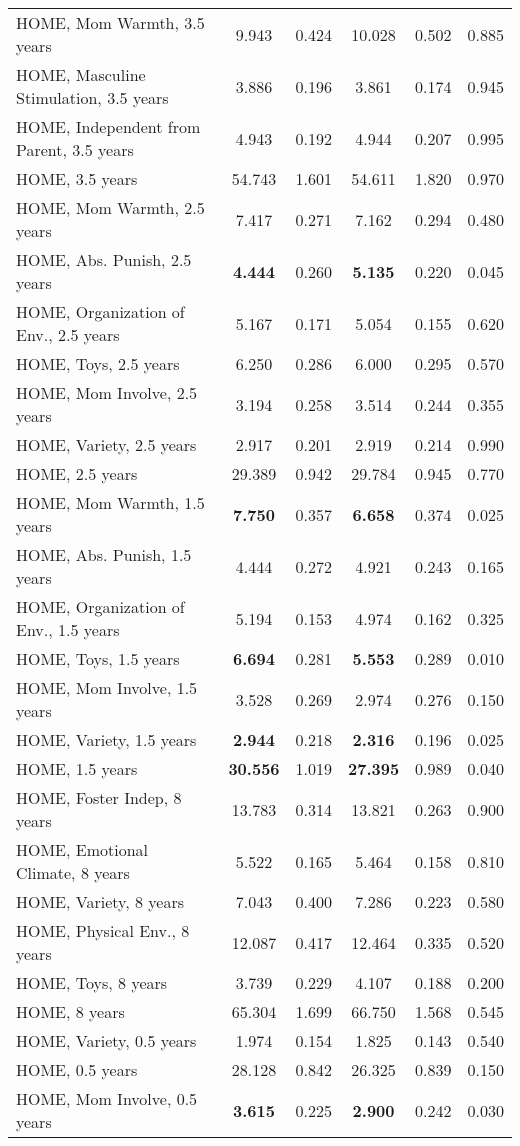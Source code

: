 \begin{tabular}{l c c c c c}
HOME, Mom Warmth, 3.5 years & 9.943 & 0.424 &  10.028 & 0.502 & 0.885 \\
HOME, Masculine Stimulation, 3.5 years & 3.886 & 0.196 &  3.861 & 0.174 & 0.945 \\
HOME, Independent from Parent, 3.5 years & 4.943 & 0.192 &  4.944 & 0.207 & 0.995 \\
HOME, 3.5 years & 54.743 & 1.601 &  54.611 & 1.820 & 0.970 \\
HOME, Mom Warmth, 2.5 years & 7.417 & 0.271 &  7.162 & 0.294 & 0.480 \\
HOME, Abs. Punish, 2.5 years & \textbf{4.444} & 0.260 &  \textbf{5.135} & 0.220 & 0.045 \\
HOME, Organization of Env., 2.5 years & 5.167 & 0.171 &  5.054 & 0.155 & 0.620 \\
HOME, Toys, 2.5 years & 6.250 & 0.286 &  6.000 & 0.295 & 0.570 \\
HOME, Mom Involve, 2.5 years & 3.194 & 0.258 &  3.514 & 0.244 & 0.355 \\
HOME, Variety, 2.5 years & 2.917 & 0.201 &  2.919 & 0.214 & 0.990 \\
HOME, 2.5 years & 29.389 & 0.942 &  29.784 & 0.945 & 0.770 \\
HOME, Mom Warmth, 1.5 years & \textbf{7.750} & 0.357 &  \textbf{6.658} & 0.374 & 0.025 \\
HOME, Abs. Punish, 1.5 years & 4.444 & 0.272 &  4.921 & 0.243 & 0.165 \\
HOME, Organization of Env., 1.5 years & 5.194 & 0.153 &  4.974 & 0.162 & 0.325 \\
HOME, Toys, 1.5 years & \textbf{6.694} & 0.281 &  \textbf{5.553} & 0.289 & 0.010 \\
HOME, Mom Involve, 1.5 years & 3.528 & 0.269 &  2.974 & 0.276 & 0.150 \\
HOME, Variety, 1.5 years & \textbf{2.944} & 0.218 &  \textbf{2.316} & 0.196 & 0.025 \\
HOME, 1.5 years & \textbf{30.556} & 1.019 &  \textbf{27.395} & 0.989 & 0.040 \\
HOME, Foster Indep, 8 years & 13.783 & 0.314 &  13.821 & 0.263 & 0.900 \\
HOME, Emotional Climate, 8 years & 5.522 & 0.165 &  5.464 & 0.158 & 0.810 \\
HOME, Variety, 8 years & 7.043 & 0.400 &  7.286 & 0.223 & 0.580 \\
HOME, Physical Env., 8 years & 12.087 & 0.417 &  12.464 & 0.335 & 0.520 \\
HOME, Toys, 8 years & 3.739 & 0.229 &  4.107 & 0.188 & 0.200 \\
HOME, 8 years & 65.304 & 1.699 &  66.750 & 1.568 & 0.545 \\
HOME, Variety, 0.5 years & 1.974 & 0.154 &  1.825 & 0.143 & 0.540 \\
HOME, 0.5 years & 28.128 & 0.842 &  26.325 & 0.839 & 0.150 \\
HOME, Mom Involve, 0.5 years & \textbf{3.615} & 0.225 &  \textbf{2.900} & 0.242 & 0.030 \\
\bottomrule
\end{tabular}
